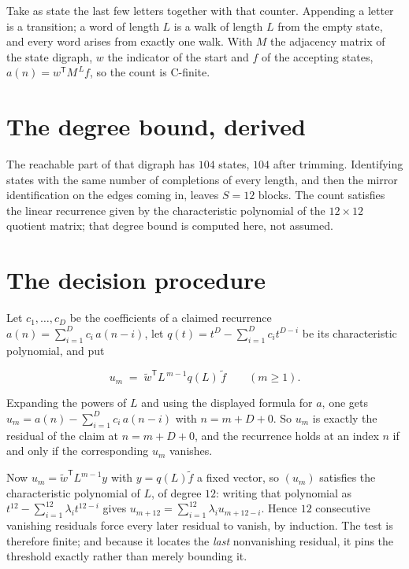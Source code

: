 \documentclass[11pt]{article}
\theoremstyle{definition}
\begin{document}
Take as state the last few letters together with that counter. Appending a letter is a transition; a word of length $L$ is a walk of length $L$ from the empty state, and every word arises from exactly one walk. With $M$ the adjacency matrix of the state digraph, $w$ the indicator of the start and $f$ of the accepting states, $a(n) = w^{\mathsf T}M^{\,L}f$, so the count is C-finite.

\section{The degree bound, derived}

The reachable part of that digraph has $104$ states, $104$ after trimming. Identifying states with the same number of completions of every length, and then the mirror identification on the edges coming in, leaves $S = 12$ blocks. The count satisfies the linear recurrence given by the characteristic polynomial of the $12\times12$ quotient matrix; that degree bound is computed here, not assumed.

\section{The decision procedure}

Let $c_1,\dots,c_D$ be the coefficients of a claimed recurrence $a(n) = \sum_{i=1}^{D} c_i\,a(n-i)$, let $q(t) = t^{D} - \sum_{i=1}^{D} c_i t^{D-i}$ be its characteristic polynomial, and put

\[u_m \;=\; \tilde w^{\mathsf T} L^{\,m-1} q(L)\,\tilde f \qquad (m \ge 1).\]

Expanding the powers of $L$ and using the displayed formula for $a$, one gets $u_m = a(n) - \sum_{i=1}^{D} c_i\,a(n-i)$ with $n = m + D + 0$. So $u_m$ is exactly the residual of the claim at $n = m + D + 0$, and the recurrence holds at an index $n$ if and only if the corresponding $u_m$ vanishes.

Now $u_m = \tilde w^{\mathsf T} L^{m-1} y$ with $y = q(L)\tilde f$ a fixed vector, so $(u_m)$ satisfies the characteristic polynomial of $L$, of degree $12$: writing that polynomial as $t^{12} - \sum_{i=1}^{12} \lambda_i t^{12-i}$ gives $u_{m+12} = \sum_{i=1}^{12} \lambda_i u_{m+12-i}$. Hence $12$ consecutive vanishing residuals force every later residual to vanish, by induction. The test is therefore finite; and because it locates the {\itshape last} nonvanishing residual, it pins the threshold exactly rather than merely bounding it.
\end{document}
